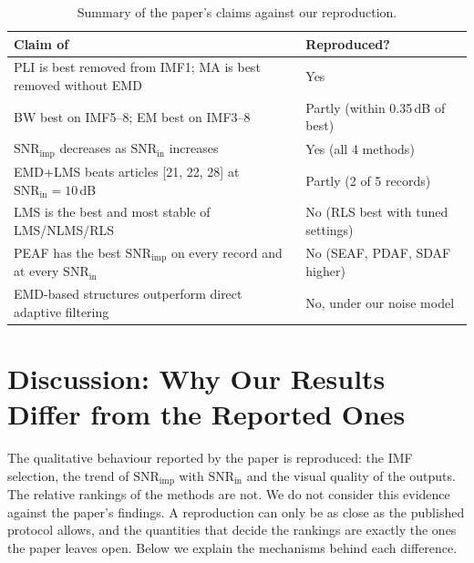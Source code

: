 \documentclass[11pt,a4paper]{article}
\newcommand{\snrin}{\mathrm{SNR}_\mathrm{in}}
\newcommand{\snrimp}{\mathrm{SNR}_\mathrm{imp}}
\begin{document}
\begin{table}[!htbp]
\centering\small
\caption{Summary of the paper's claims against our reproduction.}
\label{tab:claims}
\begin{tabular}{p{9.3cm}l}
\toprule
Claim of~\cite{dai} & Reproduced?\\
\midrule
PLI is best removed from IMF1; MA is best removed without EMD & Yes\\
BW best on IMF5--8; EM best on IMF3--8 & Partly (within 0.35\,dB of best)\\
$\snrimp$ decreases as $\snrin$ increases & Yes (all 4 methods)\\
EMD+LMS beats articles [21, 22, 28] at $\snrin=10$\,dB & Partly (2 of 5 records)\\
LMS is the best and most stable of LMS/NLMS/RLS & No (RLS best with tuned settings)\\
PEAF has the best $\snrimp$ on every record and at every $\snrin$ & No (SEAF, PDAF, SDAF higher)\\
EMD-based structures outperform direct adaptive filtering & No, under our noise model\\
\bottomrule
\end{tabular}
\end{table}

\section{Discussion: Why Our Results Differ from the Reported Ones}
\label{sec:disc}

The qualitative behaviour reported by the paper is reproduced: the IMF selection, the trend of $\snrimp$ with $\snrin$
and the visual quality of the outputs. The relative rankings of the methods are not. We do not consider this evidence
against the paper's findings. A reproduction can only be as close as the published protocol allows, and the
quantities that decide the rankings are exactly the ones the paper leaves open. Below we explain the mechanisms
behind each difference.
\end{document}
